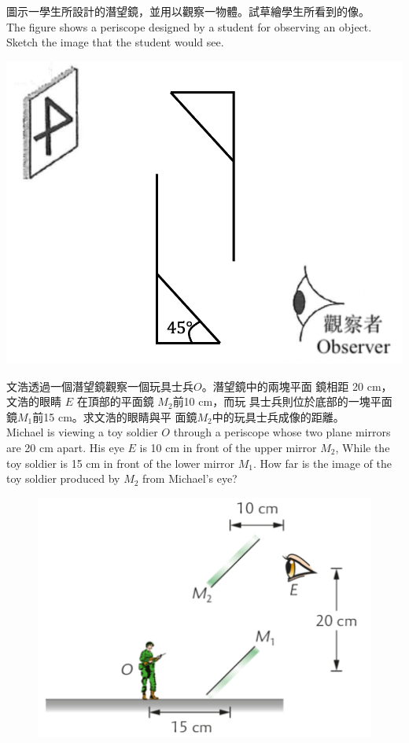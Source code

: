 \documentclass[beamer=true]{standalone}
\begin{document}
\begin{eg}
    圖示一學生所設計的潛望鏡，並用以觀察一物體。試草繪學生所看到的像。\\The figure shows a periscope designed by a student for observing an object. Sketch the image that the student would see.
    \medskip
        {\par
    \includegraphics[width=0.6\linewidth]{assets/ddqwdoqk.png}
  \par}
\end{eg}

\begin{eg}
    文浩透過一個潛望鏡觀察一個玩具士兵$O$。潛望鏡中的兩塊平面 鏡相距 20 cm，文浩的眼睛 $E$ 在頂部的平面鏡 $M_2$前10 cm，而玩 具士兵則位於底部的一塊平面鏡$M_1$前15 cm。求文浩的眼睛與平 面鏡$M_2$中的玩具士兵成像的距離。\\Michael is viewing a toy soldier $O$ through a periscope whose two plane mirrors are 20 cm apart. His eye $E$ is 10 cm in front of the upper mirror $M_2$, While the toy soldier is 15 cm in front of the lower mirror $M_1$. How far is the image of the toy soldier produced by $M_2$ from Michael's eye?
    \begin{figure}
        \centering
        \includegraphics[width=0.4\linewidth]{assets/dwdwe1age.png}
    \end{figure}
\end{eg}
\end{document}

